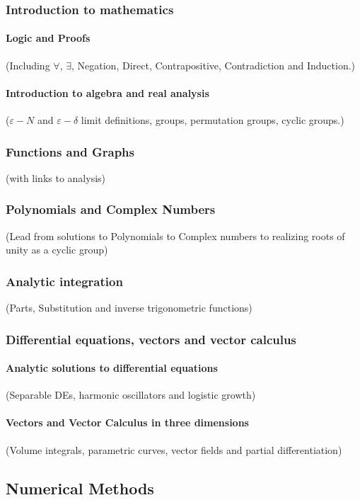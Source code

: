 \documentclass[12pt]{report}
\begin{document}
    \subsubsection{Introduction to mathematics}
        \paragraph*{Logic and Proofs} (Including $\forall$, $\exists$, Negation, Direct, Contrapositive, Contradiction and Induction.)
        \paragraph*{Introduction to algebra and real analysis} ($\varepsilon - N$ and $\varepsilon - \delta$ limit definitions, groups, permutation groups, cyclic groups.)
    \subsubsection{Functions and Graphs} (with links to analysis)
    \subsubsection{Polynomials and Complex Numbers} (Lead from solutions to Polynomials to Complex numbers to realizing roots of unity as a cyclic group)
    \subsubsection{Analytic integration} (Parts, Substitution and inverse trigonometric functions)
    \subsubsection{Differential equations, vectors and vector calculus}
        \paragraph*{Analytic solutions to differential equations} (Separable DEs, harmonic oscillators and logistic growth)
        \paragraph*{Vectors and Vector Calculus in three dimensions} (Volume integrals, parametric curves, vector fields and partial differentiation)



\subsection{Numerical Methods}
    
\end{document}
